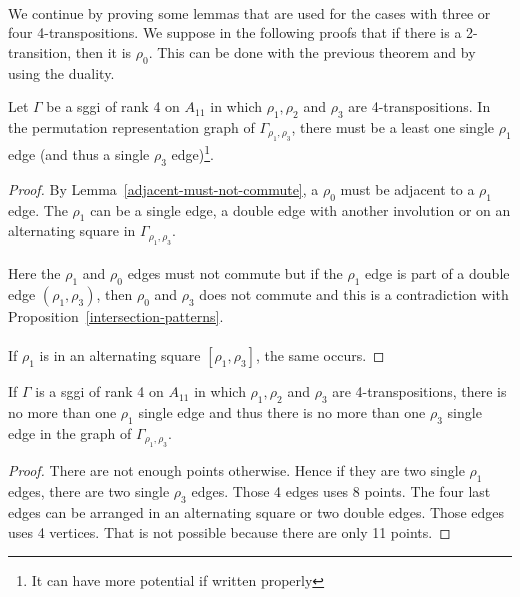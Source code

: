 \paragraph{}
We continue by proving some lemmas that are used for the cases with three or four 4-transpositions. We suppose in the following proofs that if there is a 2-transition, then it is $\rho_0$. This can be done with the previous theorem and by using the duality.

\begin{lemma}
  Let $\Gamma$ be a sggi of rank 4 on $A_{11}$ in which $\rho_1, \rho_2$ and $\rho_3$ are 4-transpositions. In the permutation representation graph of $\Gamma_{\rho_1, \rho_3}$, there must be a least one single $\rho_1$ edge (and thus a single $\rho_3$ edge)\footnote{It can have more potential if written properly}.
\end{lemma}

\begin{proof}
  By Lemma~\ref{adjacent-must-not-commute}, a $\rho_0$ must be adjacent to a $\rho_1$ edge. The $\rho_1$ can be a single edge, a double edge with another involution or on an alternating square in $\Gamma_{\rho_1, \rho_3}$.

  \paragraph{}
  Here the $\rho_1$ and $\rho_0$ edges must not commute but if the $\rho_1$ edge is part of a double edge $(\rho_1, \rho_3)$, then $\rho_0$ and $\rho_3$ does not commute and this is a contradiction with Proposition~\ref{intersection-patterns}.

  \paragraph{}
  If $\rho_1$ is in an alternating square $[\rho_1, \rho_3]$, the same occurs.

\end{proof}

\begin{lemma}
    If $\Gamma$ is a sggi of rank 4 on $A_{11}$ in which $\rho_1, \rho_2$ and $\rho_3$ are 4-transpositions, there is no more than one $\rho_1$ single edge and thus there is no more than one $\rho_3$ single edge in the graph of $\Gamma_{\rho_1, \rho_3}$.
\end{lemma}

\begin{proof}
  There are not enough points otherwise. Hence if they are two single $\rho_1$ edges, there are two single $\rho_3$ edges. Those 4 edges uses 8 points. The four last edges can be arranged in an alternating square or two double edges. Those edges uses 4 vertices. That is not possible because there are only 11 points.
\end{proof}


